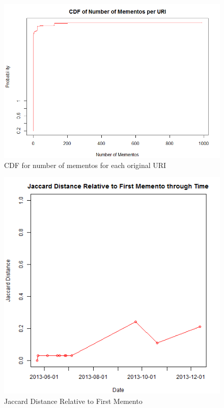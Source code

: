 \documentclass[12pt]{Report}
\begin{document}
\begin{figure}[ht]    
    \begin{center}
        \includegraphics[scale=0.60]{NumberOfMementoS.png}
        \caption{CDF for number of mementos for each original URI }
        \label{CDF for number of mementos for each original URI }
    \end{center}
\end{figure}
\newpage

 
 \begin{figure}[ht]    
    \begin{center}
        \includegraphics[scale=0.60]{link1.png}
        \caption{Jaccard Distance Relative to First Memento }
        \label{Jaccard Distance Relative to First Memento}
    \end{center}
\end{figure}
\newpage
 
\end{document}
